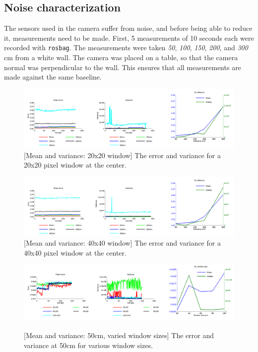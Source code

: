 \documentclass[11pt]{article}
\begin{document}
  \subsection{Noise characterization}
  The sensors used in the camera suffer from noise, and before being able to reduce it, measurements need to be made. First, 5 measurements of 10 seconds each were recorded with \texttt{rosbag}. The measurements were taken \emph{50}, \emph{100}, \emph{150}, \emph{200}, and \emph{300} cm from a white wall. The camera was placed on a table, so that the  camera normal was perpendicular to the wall. This ensures that all measurements are made against the same baseline. \par

  
  \begin{figure}[ht]
    \centering
    \includegraphics[width=1\textwidth]{figures/20x20-plot.png}
    [Mean and variance: 20x20 window]{\label{fig:20x20} The error and variance for a 20x20 pixel window at the center.}
  \end{figure}
  \begin{figure}[ht]
    \centering
    \includegraphics[width=1\textwidth]{figures/plot40x40.png}
    [Mean and variance: 40x40 window]{\label{fig:40x40} The error and variance for a 40x40 pixel window at the center.}
  \end{figure}
  \begin{figure}[ht]
    \centering
    \includegraphics[width=1\textwidth]{figures/plotwindowsizes.png}
    
    [Mean and variance: 50cm, varied window sizes]{\label{fig:variedwindow} The error and variance at 50cm for various window sizes.}
  \end{figure}
\end{document}
